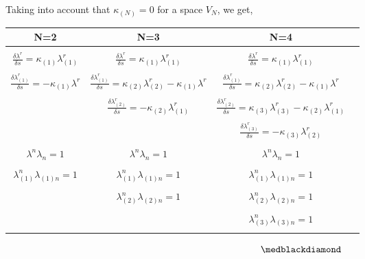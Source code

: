 Taking into account that $\kappa_{(N)} = 0$ for a space $V_N$, we get,
\begin{center}
\begin{tabular}{ |c|c|c|c| } 
\hline
N=2 & N=3 & N=4 \\
\hline
& &\\
$\frac{\delta\lambda^r}{\delta s} = \kappa_{(1)}\lambda^r_{(1)} $ & $\frac{\delta\lambda^r}{\delta s} = \kappa_{(1)}\lambda^r_{(1)} $& $\frac{\delta\lambda^r}{\delta s} = \kappa_{(1)}\lambda^r_{(1)} $ \\ 
& &\\
$\frac{\delta\lambda_{(1)}^r}{\delta s} =  - \kappa_{(1)}\lambda^r$& $\frac{\delta\lambda_{(1)}^r}{\delta s} = \kappa_{(2)}\lambda^r_{(2)} - \kappa_{(1)}\lambda^r$ & $\frac{\delta\lambda_{(1)}^r}{\delta s} = \kappa_{(2)}\lambda^r_{(2)} - \kappa_{(1)}\lambda^r$ \\ 
& &\\
& $\frac{\delta\lambda_{(2)}^r}{\delta s} =  - \kappa_{(2)}\lambda^r_{(1)}$ & $\frac{\delta\lambda_{(2)}^r}{\delta s} = \kappa_{(3)}\lambda^r_{(3)} - \kappa_{(2)}\lambda^r_{(1)}$ \\
& &\\
& & $\frac{\delta\lambda_{(3)}^r}{\delta s} =  - \kappa_{(3)}\lambda^r_{(2)}$ \\
& &\\
$\lambda^n\lambda_n= 1$&$\lambda^n\lambda_n= 1$&$\lambda^n\lambda_n= 1$\\
& &\\
$\lambda_{(1)}^n\lambda_{(1)n}= 1$&$\lambda_{(1)}^n\lambda_{(1)n}= 1$&$\lambda_{(1)}^n\lambda_{(1)n}= 1$\\
& &\\
&$\lambda_{(2)}^n\lambda_{(2)n}= 1$&$\lambda_{(2)}^n\lambda_{(2)n}= 1$\\
& &\\
&&$\lambda_{(3)}^n\lambda_{(3)n}= 1$\\
& &\\
\hline
\end{tabular}
\end{center}
$$\medblackdiamond$$
\newpage

